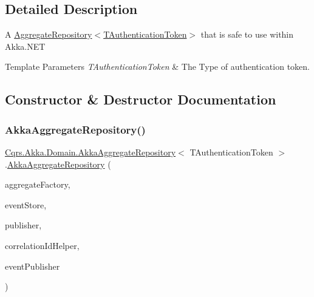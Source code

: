 \subsection{Detailed Description}
A \hyperlink{classCqrs_1_1Domain_1_1AggregateRepository_ae4a6c96b10c536a0df6a381659f87744_ae4a6c96b10c536a0df6a381659f87744}{Aggregate\+Repository$<$\+T\+Authentication\+Token$>$} that is safe to use within Akka.\+N\+ET 


\begin{DoxyTemplParams}{Template Parameters}
{\em T\+Authentication\+Token} & The Type of authentication token.\\
\hline
\end{DoxyTemplParams}


\subsection{Constructor \& Destructor Documentation}
\mbox{\label{classCqrs_1_1Akka_1_1Domain_1_1AkkaAggregateRepository_afc997ba5187ca08d3f81a0c204eda3a2_afc997ba5187ca08d3f81a0c204eda3a2}} 
\subsubsection{\texorpdfstring{Akka\+Aggregate\+Repository()}{AkkaAggregateRepository()}}
{\footnotesize\ttfamily \hyperlink{classCqrs_1_1Akka_1_1Domain_1_1AkkaAggregateRepository}{Cqrs.\+Akka.\+Domain.\+Akka\+Aggregate\+Repository}$<$ T\+Authentication\+Token $>$.\hyperlink{classCqrs_1_1Akka_1_1Domain_1_1AkkaAggregateRepository}{Akka\+Aggregate\+Repository} (\begin{DoxyParamCaption}\item[{\hyperlink{interfaceCqrs_1_1Domain_1_1Factories_1_1IAggregateFactory}{I\+Aggregate\+Factory}}]{aggregate\+Factory,  }\item[{\hyperlink{interfaceCqrs_1_1Events_1_1IEventStore}{I\+Event\+Store}$<$ T\+Authentication\+Token $>$}]{event\+Store,  }\item[{\hyperlink{interfaceCqrs_1_1Events_1_1IEventPublisher}{I\+Event\+Publisher}$<$ T\+Authentication\+Token $>$}]{publisher,  }\item[{I\+Correlation\+Id\+Helper}]{correlation\+Id\+Helper,  }\item[{\hyperlink{interfaceCqrs_1_1Akka_1_1Events_1_1IAkkaEventPublisherProxy}{I\+Akka\+Event\+Publisher\+Proxy}$<$ T\+Authentication\+Token $>$}]{event\+Publisher }\end{DoxyParamCaption})}



